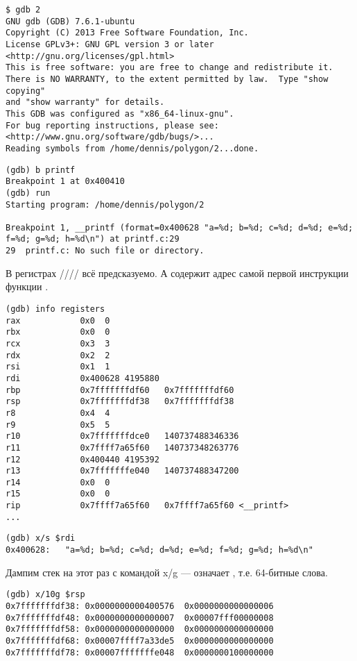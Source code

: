 \begin{lstlisting}
$ gdb 2
GNU gdb (GDB) 7.6.1-ubuntu
Copyright (C) 2013 Free Software Foundation, Inc.
License GPLv3+: GNU GPL version 3 or later <http://gnu.org/licenses/gpl.html>
This is free software: you are free to change and redistribute it.
There is NO WARRANTY, to the extent permitted by law.  Type "show copying"
and "show warranty" for details.
This GDB was configured as "x86_64-linux-gnu".
For bug reporting instructions, please see:
<http://www.gnu.org/software/gdb/bugs/>...
Reading symbols from /home/dennis/polygon/2...done.
\end{lstlisting}

\begin{lstlisting}[caption=ставим точку останова на \printf{,} запускаем]
(gdb) b printf
Breakpoint 1 at 0x400410
(gdb) run
Starting program: /home/dennis/polygon/2 

Breakpoint 1, __printf (format=0x400628 "a=%d; b=%d; c=%d; d=%d; e=%d; f=%d; g=%d; h=%d\n") at printf.c:29
29	printf.c: No such file or directory.
\end{lstlisting}

В регистрах \RSI/\RDX/\RCX// 
всё предсказуемо.
А \RIP содержит адрес самой первой инструкции функции \printf{}.

\begin{lstlisting}
(gdb) info registers
rax            0x0	0
rbx            0x0	0
rcx            0x3	3
rdx            0x2	2
rsi            0x1	1
rdi            0x400628	4195880
rbp            0x7fffffffdf60	0x7fffffffdf60
rsp            0x7fffffffdf38	0x7fffffffdf38
r8             0x4	4
r9             0x5	5
r10            0x7fffffffdce0	140737488346336
r11            0x7ffff7a65f60	140737348263776
r12            0x400440	4195392
r13            0x7fffffffe040	140737488347200
r14            0x0	0
r15            0x0	0
rip            0x7ffff7a65f60	0x7ffff7a65f60 <__printf>
...
\end{lstlisting}

\begin{lstlisting}[caption=смотрим на строку формата]
(gdb) x/s $rdi
0x400628:	"a=%d; b=%d; c=%d; d=%d; e=%d; f=%d; g=%d; h=%d\n"
\end{lstlisting}

Дампим стек на этот раз с командой x/g ---  означает , т.е. 64-битные слова.

\begin{lstlisting}
(gdb) x/10g $rsp
0x7fffffffdf38:	0x0000000000400576	0x0000000000000006
0x7fffffffdf48:	0x0000000000000007	0x00007fff00000008
0x7fffffffdf58:	0x0000000000000000	0x0000000000000000
0x7fffffffdf68:	0x00007ffff7a33de5	0x0000000000000000
0x7fffffffdf78:	0x00007fffffffe048	0x0000000100000000
\end{lstlisting}

